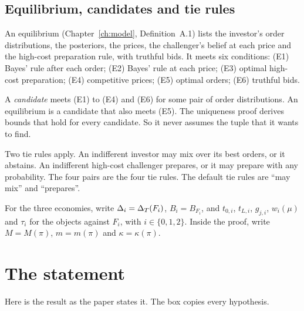 \subsection{Equilibrium, candidates and tie rules}

An equilibrium (Chapter~\ref{ch:model}, Definition~A.1) lists the investor's order distributions, the posteriors,
the prices, the challenger's belief at each price and the high-cost preparation rule, with truthful bids. It
meets six conditions: (E1) Bayes' rule after each order; (E2) Bayes' rule at each price; (E3) optimal high-cost
preparation; (E4) competitive prices; (E5) optimal orders; (E6) truthful bids.

A \emph{candidate} meets (E1) to (E4) and (E6) for some pair of order distributions. An equilibrium is a
candidate that also meets (E5). The uniqueness proof derives bounds that hold for every candidate. So it never
assumes the tuple that it wants to find.

Two tie rules apply. An indifferent investor may mix over its best orders, or it abstains. An indifferent
high-cost challenger prepares, or it may prepare with any probability. The four pairs are the four tie rules.
The default tie rules are ``may mix'' and ``prepares''.

For the three economies, write \(\Delta_i=\Delta_T(F_i)\), \(B_i=B_{F_i}\), and \(t_{0,i}\), \(t_{L,i}\), \(g_{j,i}\),
\(w_i(\mu)\) and \(\tau_i\) for the objects against \(F_i\), with \(i\in\{0,1,2\}\). Inside the proof, write
\(M=M(\pi)\), \(m=m(\pi)\) and \(\kappa=\kappa(\pi)\).

\section{The statement}\label{sec:ccc-statement}

Here is the result as the paper states it. The box copies every hypothesis.

